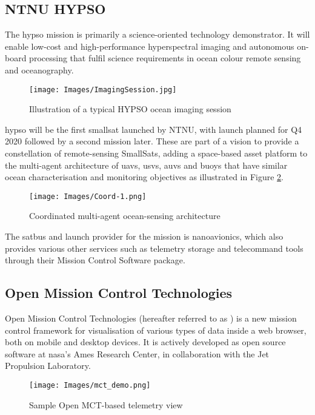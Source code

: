 \subsection{NTNU HYPSO}
The \acrshort{hypso} mission is primarily a science-oriented technology demonstrator. It will enable low-cost and high-performance hyperspectral imaging and autonomous on-board processing that fulfil science requirements in ocean colour remote sensing and oceanography.

\begin{figure}[ht]
    \centering
    \texttt{[image: Images/ImagingSession.jpg]}
    \caption{Illustration of a typical HYPSO ocean imaging session}
    \label{fig:imaging}
\end{figure}

\acrshort{hypso} will be the first \Gls{smallsat} launched by NTNU, with launch planned for Q4 2020 followed by a second mission later. These are part of a vision to provide a constellation of remote-sensing SmallSats, adding a space-based asset platform to the multi-agent architecture of \acrshort{uav}s, \acrshort{usv}s, \acrshort{auv}s and buoys that have similar ocean characterisation and monitoring objectives as illustrated in Figure \ref{fig:ocean}.

\begin{figure}[ht]
    \centering
    \texttt{[image: Images/Coord-1.png]}
    \caption{Coordinated multi-agent ocean-sensing architecture}
    \label{fig:ocean}
\end{figure}

The \gls{satbus} and launch provider for the mission is \Gls{nanoavionics}, which also provides various other services such as telemetry storage and telecommand tools through their Mission Control Software package.

\subsection{Open Mission Control Technologies}
Open Mission Control Technologies (hereafter referred to as ) is a new mission control framework for visualisation of various types of data inside a web browser, both on mobile and desktop devices. It is actively developed as open source software at \acrshort{nasa}'s Ames Research Center, in collaboration with the Jet Propulsion Laboratory. 

\begin{figure}[H]
    \centering
    \texttt{[image: Images/mct\_demo.png]}
    \caption{Sample Open MCT-based telemetry view}
    \label{fig:omctdemo}
\end{figure}

